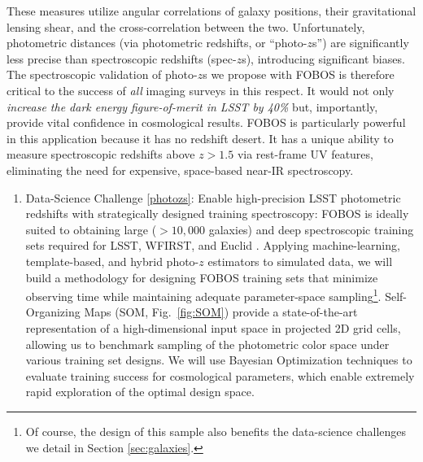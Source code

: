 \documentclass[oneside,11pt]{amsart}
\newcounter{chalno}
\newcommand{\chal}[1]{\refstepcounter{chalno}\label{#1}}
\begin{document}
These measures utilize angular correlations of galaxy positions, their
gravitational lensing shear, and the cross-correlation between the two.
Unfortunately, photometric distances (via photometric redshifts, or
``photo-$z$s'') are significantly less precise than spectroscopic
redshifts (spec-$z$s), introducing significant biases.  The
spectroscopic validation of photo-$z$s we propose with FOBOS is
therefore critical to the success of {\it all} imaging surveys in this
respect. It would not only \emph{increase the dark energy
figure-of-merit in LSST by 40\%} \citep{newman15} but, importantly,
provide vital confidence in cosmological results.  FOBOS is particularly
powerful in this application because it has no redshift desert.  It has
a unique ability to measure spectroscopic redshifts above $z > 1.5$ via
rest-frame UV features, eliminating the need for expensive, space-based
near-IR spectroscopy.

\chal{photozs}
%
\begin{enumerate}[rightmargin=0.2cm,leftmargin=0.2cm]
%
\item[] {\textsf {\large Data-Science Challenge \ref{photozs}: Enable
high-precision LSST photometric redshifts with strategically designed
training spectroscopy:}}  FOBOS is ideally suited to obtaining large
($>10,000$ galaxies) and deep spectroscopic training sets required for
LSST, WFIRST, and Euclid \citep[see][] {newman15}.  Applying
machine-learning, template-based, and hybrid photo-$z$ estimators to
simulated data, we will build a methodology for designing FOBOS training
sets that minimize observing time while maintaining adequate
parameter-space sampling\footnote{
%
Of course, the design of this sample also benefits the data-science
challenges we detail in Section \ref{sec:galaxies}.}.
%
Self-Organizing Maps (SOM, Fig.~\ref {fig:SOM}) provide a
state-of-the-art representation of a high-dimensional input space in
projected 2D grid cells, allowing us to benchmark sampling of the
photometric color space under various training set designs.  We will use
Bayesian Optimization techniques to evaluate training success for
cosmological parameters, which enable extremely rapid exploration of the
optimal design space.

\end{enumerate}
\end{document}
